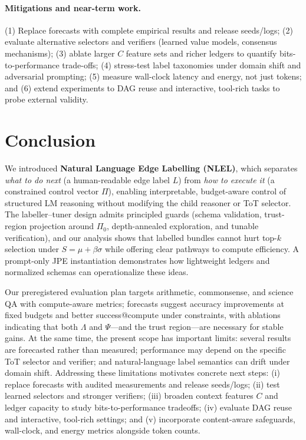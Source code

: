 \documentclass{article}
\theoremstyle{plain}
\theoremstyle{definition}
\theoremstyle{remark}
\begin{document}
\paragraph{Mitigations and near-term work.}
(1) Replace forecasts with complete empirical results and release seeds/logs;
(2) evaluate alternative selectors and verifiers (learned value models, consensus mechanisms);
(3) ablate larger $C$ feature sets and richer ledgers to quantify bits-to-performance trade-offs;
(4) stress-test label taxonomies under domain shift and adversarial prompting;
(5) measure wall-clock latency and energy, not just tokens; and
(6) extend experiments to DAG reuse and interactive, tool-rich tasks to probe external validity.
\section{Conclusion}

We introduced \textbf{Natural Language Edge Labelling (NLEL)}, which separates \emph{what to do next} (a human-readable edge label \(L\)) from \emph{how to execute it} (a constrained control vector \(\Pi\)), enabling interpretable, budget-aware control of structured LM reasoning without modifying the child reasoner or ToT selector. The labeller--tuner design admits principled guards (schema validation, trust-region projection around \(\Pi_{0}\), depth-annealed exploration, and tunable verification), and our analysis shows that labelled bundles cannot hurt top-\(k\) selection under \(S=\mu+\beta\sigma\) while offering clear pathways to compute efficiency. A prompt-only JPE instantiation demonstrates how lightweight ledgers and normalized schemas can operationalize these ideas.

Our preregistered evaluation plan targets arithmetic, commonsense, and science QA with compute-aware metrics; forecasts suggest accuracy improvements at fixed budgets and better success@compute under constraints, with ablations indicating that both \(\Lambda\) and \(\Psi\)---and the trust region---are necessary for stable gains. At the same time, the present scope has important limits: several results are forecasted rather than measured; performance may depend on the specific ToT selector and verifier; and natural-language label semantics can drift under domain shift. Addressing these limitations motivates concrete next steps: (i) replace forecasts with audited measurements and release seeds/logs; (ii) test learned selectors and stronger verifiers; (iii) broaden context features \(C\) and ledger capacity to study bits-to-performance tradeoffs; (iv) evaluate DAG reuse and interactive, tool-rich settings; and (v) incorporate content-aware safeguards, wall-clock, and energy metrics alongside token counts.
\end{document}
